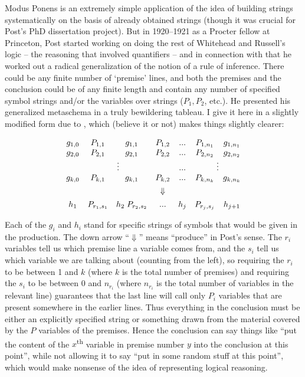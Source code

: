 \documentclass[output=paper]{langscibook}
\begin{document}
Modus Ponens is an extremely simple application of the idea of building strings systematically on the basis of already obtained strings (though it was crucial for Post's PhD dissertation project). But in 1920--1921 as a Procter fellow at Princeton, Post started working on doing the rest of Whitehead and Russell's logic -- the reasoning that involved quantifiers -- and in connection with that he worked out a radical generalization of the notion of a rule of inference. There could be any finite number of `premise' lines, and both the premises and the conclusion could be of any finite length and contain any number of specified symbol strings and/or the variables over strings ($P_1, P_2$, etc.). He presented his generalized metaschema in a truly bewildering tableau. I give it here in a slightly modified form due to \citet{Davis82}, which (believe it or not) makes things slightly clearer:

\large
\begin{displaymath}
\begin{array}{ccccccc} g_{1,0} & P_{1,1} & g_{1,1} & P_{1,2}  & . . . & P_{1,n_1} & g_{1,n_1} \\ g_{2,0} & P_{2,1} & g_{2,1} & P_{2,2}  & . . . & P_{2,n_2} & g_{2,n_2} \\ \multicolumn{4}{c}{\vdots}             & . . . & \multicolumn{2}{c}{\vdots} \\ g_{k,0} & P_{k,1} & g_{k,1} & P_{k,2}  & . . . & P_{k,n_k} & g_{k,n_k}\\[1ex]         &         &         &\Downarrow&       &           & \\[1ex] h_1 & P_{r_1,s_1} & h_2 \; P_{r_2,s_2} & . . . & h_j & P_{r_j,s_j} & h_{j+1} \end{array} \end{displaymath}

\normalsize\smallskip\noindent  Each of the $g_i$ and $h_i$ stand for specific strings of symbols that would be given in the production. The down arrow ``$\Downarrow$'' means ``produce'' in Post's sense. The $r_i$ variables tell us which premise line a variable comes from, and the $s_i$ tell us which variable we are talking about (counting from the left), so requiring the $r_i$ to be between 1 and $k$ (where $k$ is the total number of premises) and requiring the $s_i$ to be between 0 and $n_{r_i}$ (where $n_{r_i}$ is the total number of variables in the relevant line) guarantees that the last line will call only $P_i$ variables that are present somewhere in the earlier lines. Thus everything in the conclusion must be either an explicitly specified string or something drawn from the material covered by the $P$ variables of the premises. Hence the conclusion can say things like ``put the content of the $x$\textsuperscript{th} variable in premise number $y$ into the conclusion at this point'', while not allowing it to say ``put in some random stuff at this point'', which would make nonsense of the idea of representing logical reasoning.
\end{document}
